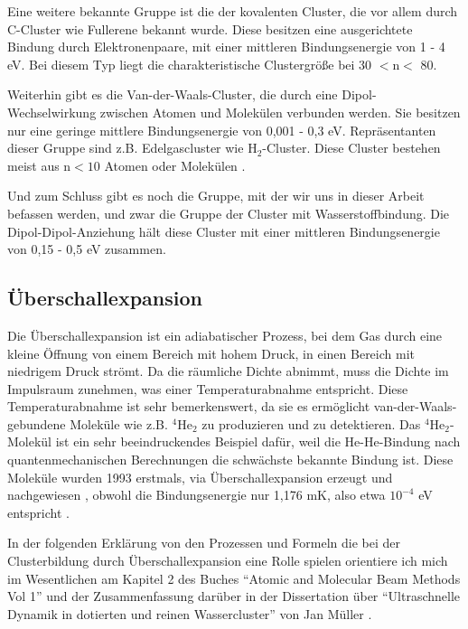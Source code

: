 Eine weitere bekannte Gruppe ist die der kovalenten Cluster, die vor allem durch C-Cluster wie Fullerene bekannt wurde. Diese besitzen eine ausgerichtete Bindung durch Elektronenpaare, mit einer mittleren Bindungsenergie von 1 - 4 eV. Bei diesem Typ liegt die charakteristische Clustergröße bei 30 $\mathrm{< n <}$ 80.

Weiterhin gibt es die Van-der-Waals-Cluster, die durch eine Dipol-Wechselwirkung zwischen Atomen und Molekülen verbunden werden. Sie besitzen nur eine geringe mittlere Bindungsenergie von 0,001 - 0,3 eV. Repräsentanten dieser Gruppe sind z.B. Edelgascluster wie $\mathrm{H}_2$-Cluster. Diese Cluster bestehen meist aus $\mathrm{n < 10}$ Atomen oder Molekülen .

Und zum Schluss gibt es noch die Gruppe, mit der wir uns in dieser Arbeit befassen werden, und zwar die Gruppe der Cluster mit Wasserstoffbindung. Die Dipol-Dipol-Anziehung hält diese Cluster mit einer mittleren Bindungsenergie von 0,15 - 0,5 eV zusammen. \\


\subsection{Überschallexpansion}

Die Überschallexpansion ist ein adiabatischer Prozess, bei dem Gas durch eine kleine Öffnung von einem Bereich mit hohem Druck, in einen Bereich mit niedrigem Druck strömt. Da die räumliche Dichte abnimmt, muss die Dichte im Impulsraum zunehmen, was einer Temperaturabnahme entspricht. Diese Temperaturabnahme ist sehr bemerkenswert, da sie es ermöglicht van-der-Waals-gebundene Moleküle wie z.B. $\mathrm{^4}\mathrm{He}_2$ zu produzieren und zu detektieren. Das $\mathrm{^4}\mathrm{He}_2$-Molekül ist ein sehr beeindruckendes Beispiel dafür, weil die He-He-Bindung nach quantenmechanischen Berechnungen die schwächste bekannte Bindung ist. Diese Moleküle wurden 1993 erstmals, via Überschallexpansion erzeugt und nachgewiesen \cite{Luo1993}, obwohl die Bindungsenergie  nur 1,176 mK, also etwa $\mathrm{10^{-4}}$ eV entspricht \cite{Lohr2007}. 

In der folgenden Erklärung von den Prozessen und Formeln die bei der Clusterbildung durch Überschallexpansion eine Rolle spielen orientiere ich mich im Wesentlichen am Kapitel 2 des Buches \enquote{Atomic and Molecular Beam Methods Vol 1}\cite{scoles1988} und der Zusammenfassung darüber in der Dissertation über \enquote{Ultraschnelle Dynamik in dotierten und reinen Wassercluster} von Jan Müller \cite{mul13}.

